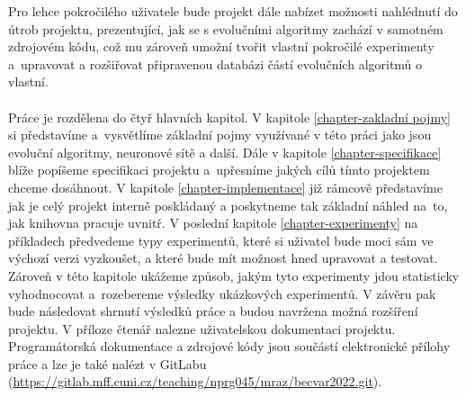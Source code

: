 Pro lehce pokročilého uživatele bude projekt dále nabízet možnosti nahlédnutí
do útrob projektu, prezentující, jak se s evolučními algoritmy zachází v
samotném zdrojovém kódu, což mu zároveň umožní tvořit vlastní pokročilé
experimenty a~upravovat a rozšiřovat připravenou databázi částí evolučních
algoritmů o vlastní.

\paragraph{}
Práce je rozdělena do čtyř hlavních kapitol. V kapitole
\ref{chapter-zakladní pojmy} si představíme a~vysvětlíme základní pojmy
využívané v této práci jako jsou evoluční algoritmy, neuronové sítě a další.
Dále v kapitole \ref{chapter-specifikace} blíže popíšeme specifikaci projektu
a~upřesníme jakých cílů tímto projektem chceme dosáhnout. V kapitole
\ref{chapter-implementace} již rámcově představíme jak je celý projekt interně
poskládaný a poskytneme tak základní náhled na~to, jak knihovna pracuje uvnitř.
V poslední kapitole \ref{chapter-experimenty} na příkladech předvedeme
typy experimentů, které si uživatel bude moci sám ve výchozí verzi vyzkoušet, a
které bude mít možnost hned upravovat a testovat. Zároveň v této kapitole
ukážeme způsob, jakým tyto experimenty jdou statisticky vyhodnocovat
a~rozebereme výsledky ukázkových experimentů. V závěru pak bude následovat
shrnutí výsledků práce a budou navržena možná rozšíření projektu. V příloze
čtenář nalezne uživatelskou dokumentaci projektu. Programátorská dokumentace a
zdrojové kódy jsou součástí elektronické přílohy práce a lze je také nalézt v
GitLabu
(\url{https://gitlab.mff.cuni.cz/teaching/nprg045/mraz/becvar2022.git}).
